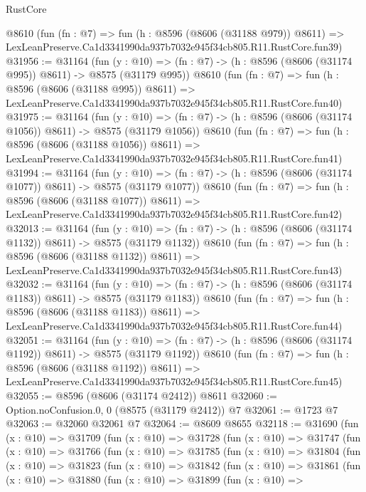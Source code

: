 \begin{lexlean}{RustCore}
\begin{coremodule}
    @8610
    (fun (fn : @7) =>
    fun (h : @8596 (@8606 (@31188 @979)) @8611) =>
    LexLeanPreserve.Ca1d3341990da937b7032e945f34cb805.R11.RustCore.fun39)
@31956 := @31164
    (fun (y : @10) => (fn : @7) -> (h : @8596 (@8606 (@31174 @995)) @8611) -> @8575 (@31179 @995))
    @8610
    (fun (fn : @7) =>
    fun (h : @8596 (@8606 (@31188 @995)) @8611) =>
    LexLeanPreserve.Ca1d3341990da937b7032e945f34cb805.R11.RustCore.fun40)
@31975 := @31164
    (fun (y : @10) => (fn : @7) -> (h : @8596 (@8606 (@31174 @1056)) @8611) -> @8575 (@31179 @1056))
    @8610
    (fun (fn : @7) =>
    fun (h : @8596 (@8606 (@31188 @1056)) @8611) =>
    LexLeanPreserve.Ca1d3341990da937b7032e945f34cb805.R11.RustCore.fun41)
@31994 := @31164
    (fun (y : @10) => (fn : @7) -> (h : @8596 (@8606 (@31174 @1077)) @8611) -> @8575 (@31179 @1077))
    @8610
    (fun (fn : @7) =>
    fun (h : @8596 (@8606 (@31188 @1077)) @8611) =>
    LexLeanPreserve.Ca1d3341990da937b7032e945f34cb805.R11.RustCore.fun42)
@32013 := @31164
    (fun (y : @10) => (fn : @7) -> (h : @8596 (@8606 (@31174 @1132)) @8611) -> @8575 (@31179 @1132))
    @8610
    (fun (fn : @7) =>
    fun (h : @8596 (@8606 (@31188 @1132)) @8611) =>
    LexLeanPreserve.Ca1d3341990da937b7032e945f34cb805.R11.RustCore.fun43)
@32032 := @31164
    (fun (y : @10) => (fn : @7) -> (h : @8596 (@8606 (@31174 @1183)) @8611) -> @8575 (@31179 @1183))
    @8610
    (fun (fn : @7) =>
    fun (h : @8596 (@8606 (@31188 @1183)) @8611) =>
    LexLeanPreserve.Ca1d3341990da937b7032e945f34cb805.R11.RustCore.fun44)
@32051 := @31164
    (fun (y : @10) => (fn : @7) -> (h : @8596 (@8606 (@31174 @1192)) @8611) -> @8575 (@31179 @1192))
    @8610
    (fun (fn : @7) =>
    fun (h : @8596 (@8606 (@31188 @1192)) @8611) =>
    LexLeanPreserve.Ca1d3341990da937b7032e945f34cb805.R11.RustCore.fun45)
@32055 := @8596 (@8606 (@31174 @2412)) @8611
@32060 := Option.noConfusion.{0, 0} (@8575 (@31179 @2412)) @7
@32061 := @1723 @7
@32063 := @32060 @32061 @7
@32064 := @8609 @8655
@32118 := @31690
    (fun (x : @10) =>
    @31709
      (fun (x : @10) =>
      @31728
        (fun (x : @10) =>
        @31747
          (fun (x : @10) =>
          @31766
            (fun (x : @10) =>
            @31785
              (fun (x : @10) =>
              @31804
                (fun (x : @10) =>
                @31823
                  (fun (x : @10) =>
                  @31842
                    (fun (x : @10) =>
                    @31861
                      (fun (x : @10) =>
                      @31880
                        (fun (x : @10) =>
                        @31899
                          (fun (x : @10) =>

\end{coremodule}
\end{lexlean}
